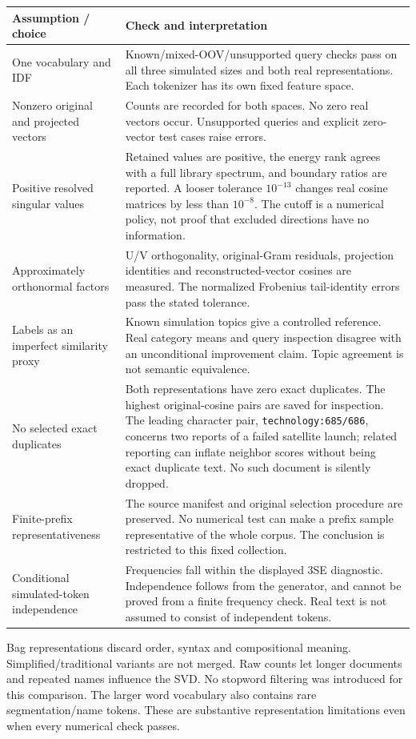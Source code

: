 \begin{longtable}{p{}p{}}
\toprule Assumption / choice & Check and interpretation\\\midrule\endhead
One vocabulary and IDF & Known/mixed-OOV/unsupported query checks pass on all
three simulated sizes and both real representations. Each tokenizer has its
own fixed feature space.\\
Nonzero original and projected vectors & Counts are recorded for both spaces.
No zero real vectors occur. Unsupported queries and explicit zero-vector
test cases raise errors.\\
Positive resolved singular values & Retained values are positive, the energy
rank agrees with a full library spectrum, and boundary ratios are reported.
A looser tolerance $10^{-13}$ changes real cosine matrices by less than
$10^{-8}$. The cutoff is a numerical policy, not proof that excluded
directions have no information.\\
Approximately orthonormal factors & U/V orthogonality, original-Gram residuals,
projection identities and reconstructed-vector cosines are measured.
The normalized Frobenius tail-identity errors pass the stated tolerance.\\
Labels as an imperfect similarity proxy & Known simulation topics give a
controlled reference. Real category means and query inspection disagree
with an unconditional improvement claim. Topic agreement is not semantic
equivalence.\\
No selected exact duplicates & Both representations have zero exact duplicates.
The highest original-cosine pairs are saved for inspection. The leading
character pair, \texttt{technology:685/686}, concerns two reports of a
failed satellite launch; related reporting can inflate neighbor scores
without being exact duplicate text. No such document is silently dropped.\\
Finite-prefix representativeness & The source manifest and original selection
procedure are preserved. No numerical test can make a prefix sample
representative of the whole corpus. The conclusion is restricted to this
fixed collection.\\
Conditional simulated-token independence & Frequencies fall within the displayed
3SE diagnostic. Independence follows from the generator, and cannot be
proved from a finite frequency check. Real text is not assumed to consist
of independent tokens.\\
\bottomrule
\end{longtable}
Bag representations discard order, syntax and compositional meaning.
Simplified/traditional variants are not merged.
Raw counts let longer documents and repeated names influence the SVD.
No stopword filtering was introduced for this comparison.
The larger word vocabulary also contains rare segmentation/name tokens.
These are substantive representation limitations even when every
numerical check passes.

